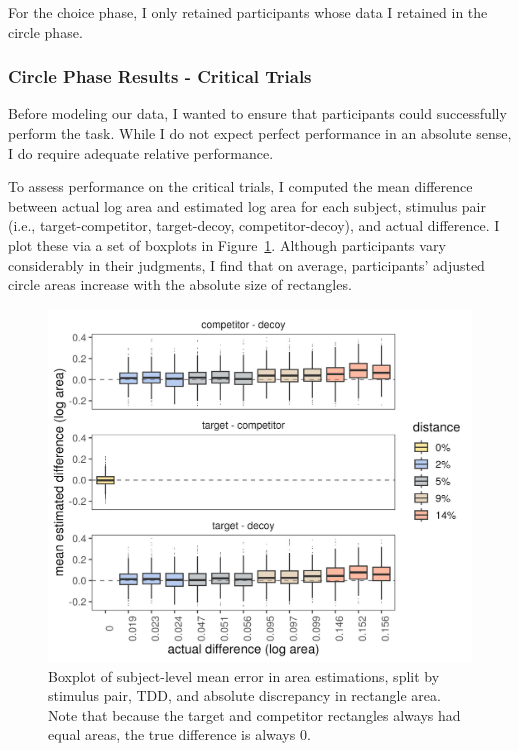 For the choice phase, I only retained participants whose data I retained in the circle phase.

\subsubsection{Circle Phase Results - Critical Trials}
Before modeling our data, I wanted to ensure that participants could successfully perform the task. While I do not expect perfect performance in an absolute sense, I do require adequate relative performance. 

To assess performance on the critical trials, I computed the mean difference between actual log area and estimated log area for each subject, stimulus pair (i.e., target-competitor, target-decoy, competitor-decoy), and actual difference. I plot these via a set of boxplots in Figure~\ref{fig:circle_boxplots}. Although participants vary considerably in their judgments, I find that on average, participants' adjusted circle areas increase with the absolute size of rectangles. 


\begin{figure}
   \includegraphics[width=\textwidth]{figures/circleAreaPhase_boxplot_meanlogdiffs_no_outliers.jpeg}
   \caption{Boxplot of subject-level mean error in area estimations, split by stimulus pair, TDD, and absolute discrepancy in rectangle area. Note that because the target and competitor rectangles always had equal areas, the true difference is always 0.}
   \label{fig:circle_boxplots}
\end{figure}

